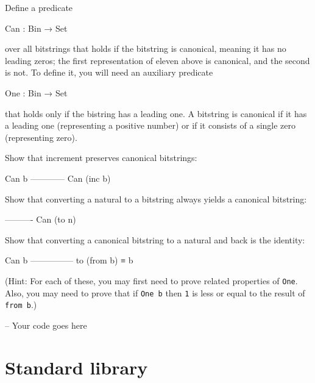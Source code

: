 Define a predicate

\begin{myDisplay}
Can : Bin → Set
\end{myDisplay}

over all bitstrings that holds if the bitstring is canonical, meaning it
has no leading zeros; the first representation of eleven above is
canonical, and the second is not. To define it, you will need an
auxiliary predicate

\begin{myDisplay}
One : Bin → Set
\end{myDisplay}

that holds only if the bistring has a leading one. A bitstring is
canonical if it has a leading one (representing a positive number) or if
it consists of a single zero (representing zero).

Show that increment preserves canonical bitstrings:

\begin{myDisplay}
Can b
------------
Can (inc b)
\end{myDisplay}

Show that converting a natural to a bitstring always yields a canonical
bitstring:

\begin{myDisplay}
----------
Can (to n)
\end{myDisplay}

Show that converting a canonical bitstring to a natural and back is the
identity:

\begin{myDisplay}
Can b
---------------
to (from b) ≡ b
\end{myDisplay}

(Hint: For each of these, you may first need to prove related properties
of \texttt{One}. Also, you may need to prove that if \texttt{One\ b}
then \texttt{1} is less or equal to the result of \texttt{from\ b}.)

\begin{fence}
\begin{code}
-- Your code goes here
\end{code}
\end{fence}

\hypertarget{standard-library}{%
\section{Standard library}\label{standard-library}}

